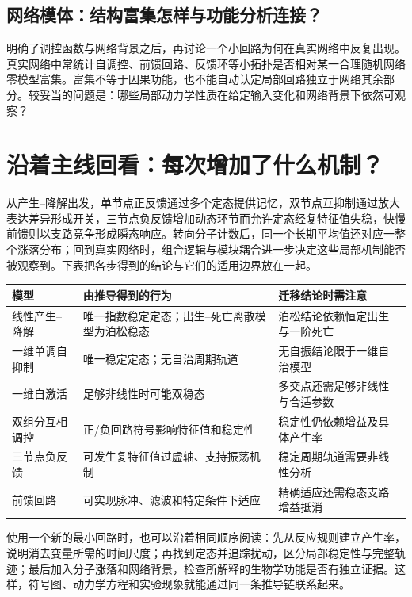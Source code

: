 \documentclass[11pt,a4paper,UTF8,fontset=fandol]{ctexart}
\begin{document}
\subsection{网络模体：结构富集怎样与功能分析连接？}
明确了调控函数与网络背景之后，再讨论一个小回路为何在真实网络中反复出现。
真实网络中常统计自调控、前馈回路、反馈环等小拓扑是否相对某一合理随机网络零模型富集。富集不等于因果功能，也不能自动认定局部回路独立于网络其余部分。较妥当的问题是：哪些局部动力学性质在给定输入变化和网络背景下依然可观察？

\section{沿着主线回看：每次增加了什么机制？}
从产生--降解出发，单节点正反馈通过多个定态提供记忆，双节点互抑制通过放大表达差异形成开关，三节点负反馈增加动态环节而允许定态经复特征值失稳，快慢前馈则以支路竞争形成瞬态响应。转向分子计数后，同一个长期平均值还对应一整个涨落分布；回到真实网络时，组合逻辑与模块耦合进一步决定这些局部机制能否被观察到。下表把各步得到的结论与它们的适用边界放在一起。
\begin{center}\begin{tabular}{>{\raggedright\arraybackslash}p{3.1cm}>{\raggedright\arraybackslash}p{6cm}>{\raggedright\arraybackslash}p{5.6cm}}\toprule
模型 & 由推导得到的行为 & 迁移结论时需注意\\\midrule
线性产生--降解 & 唯一指数稳定定态；出生--死亡离散模型为泊松稳态 & 泊松结论依赖恒定出生与一阶死亡\\
一维单调自抑制 & 唯一稳定定态；无自治周期轨道 & 无自振结论限于一维自治模型\\
一维自激活 & 足够非线性时可能双稳态 & 多交点还需足够非线性与合适参数\\
双组分互相调控 & 正/负回路符号影响特征值和稳定性 & 稳定性仍依赖增益及具体产生率\\
三节点负反馈 & 可发生复特征值过虚轴、支持振荡机制 & 稳定周期轨道需要非线性分析\\
前馈回路 & 可实现脉冲、滤波和特定条件下适应 & 精确适应还需稳态支路增益抵消\\
\bottomrule\end{tabular}\end{center}

使用一个新的最小回路时，也可以沿着相同顺序阅读：先从反应规则建立产生率，说明消去变量所需的时间尺度；再找到定态并追踪扰动，区分局部稳定性与完整轨迹；最后加入分子涨落和网络背景，检查所解释的生物学功能是否有独立证据。这样，符号图、动力学方程和实验现象就能通过同一条推导链联系起来。
\end{document}

